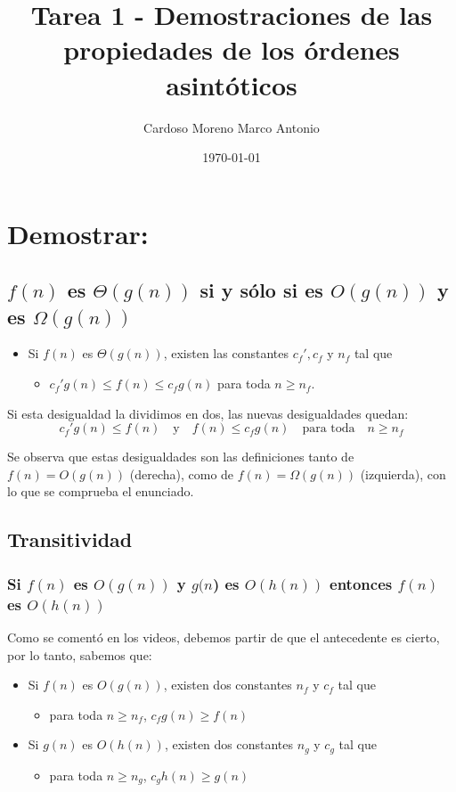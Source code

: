 \documentclass[letterpaper]{article}
\author{Cardoso Moreno Marco Antonio}
\date{\today}
\title{Tarea 1 - Demostraciones de las propiedades de los órdenes asintóticos}
\begin{document}
\maketitle

\section{Demostrar:}
\label{sec:orgbe567fb}
\subsection{\(f(n)\) es \(\Theta(g(n))\) si y sólo si es \(O(g(n))\) y es \(\Omega(g(n))\)}
\label{sec:org5cd6a49}
\begin{itemize}
\item Si \(f(n)\) es \(\Theta(g(n))\), existen las constantes \(c_f', c_f\) y \(n_f\) tal
que
\begin{itemize}
\item \(c_f' g(n) \leq f(n) \leq c_f g(n)\) para toda \(n \geq n_f\).
\end{itemize}
\end{itemize}

\noindent
Si esta desigualdad la dividimos en dos, las nuevas desigualdades quedan:
$$
c_f' g(n) \leq f(n) \quad \mbox{y} \quad f(n) \leq c_f g(n)
    \quad \mbox{para toda} \quad n \geq n_f
$$

\noindent
Se observa que estas desigualdades son las definiciones tanto de
\(f(n) = O(g(n))\) (derecha), como de \(f(n) = \Omega(g(n))\) (izquierda), con lo
que se comprueba el enunciado.
\subsection{Transitividad}
\label{sec:org3ddb54e}
\subsubsection{Si \(f(n)\) es \(O(g(n))\) y \(g(n\)) es \(O(h(n))\) entonces \(f(n)\) es \(O(h(n))\)}
\label{sec:org350b076}
Como se comentó en los videos, debemos partir de que el antecedente es cierto,
por lo tanto, sabemos que:
\begin{itemize}
\item Si \(f(n)\) es \(O(g(n))\), existen dos constantes \(n_f\) y \(c_f\) tal que
\begin{itemize}
\item para toda \(n \geq n_f\), \(c_f g(n) \geq f(n)\)
\end{itemize}
\item Si \(g(n)\) es \(O(h(n))\), existen dos constantes \(n_g\) y \(c_g\) tal que
\begin{itemize}
\item para toda \(n \geq n_g\), \(c_g h(n) \geq g(n)\)
\end{itemize}
\end{itemize}
\end{document}
